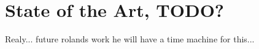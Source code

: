 



\section{State of the Art, TODO?}

Realy... future rolands work
he will have a time machine for this...

